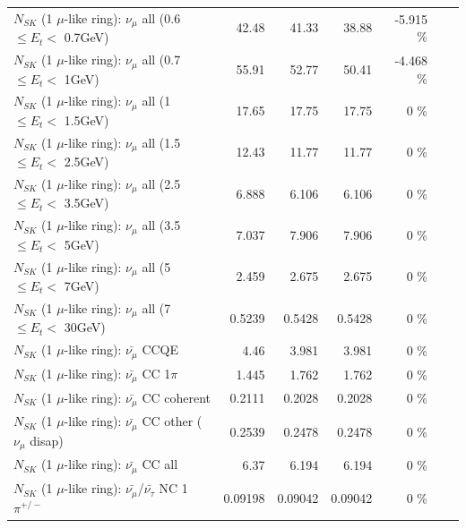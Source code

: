 \begin{table}
\begin{tabular}{| l | r | r | r  r | r  r |}
       $N_{SK}$ (1 $\mu$-like ring): $\nu_{\mu}$ all (0.6 $\leq E_{t} <$ 0.7GeV) &           42.48 &          41.33 &          38.88 &  -5.915 \%  & & \\
         $N_{SK}$ (1 $\mu$-like ring): $\nu_{\mu}$ all (0.7 $\leq E_{t} <$ 1GeV) &           55.91 &          52.77 &          50.41 &  -4.468 \%  & & \\
         $N_{SK}$ (1 $\mu$-like ring): $\nu_{\mu}$ all (1 $\leq E_{t} <$ 1.5GeV) &           17.65 &          17.75 &          17.75 &       0 \%  & & \\
       $N_{SK}$ (1 $\mu$-like ring): $\nu_{\mu}$ all (1.5 $\leq E_{t} <$ 2.5GeV) &           12.43 &          11.77 &          11.77 &       0 \%  & & \\
       $N_{SK}$ (1 $\mu$-like ring): $\nu_{\mu}$ all (2.5 $\leq E_{t} <$ 3.5GeV) &           6.888 &          6.106 &          6.106 &       0 \%  & & \\
         $N_{SK}$ (1 $\mu$-like ring): $\nu_{\mu}$ all (3.5 $\leq E_{t} <$ 5GeV) &           7.037 &          7.906 &          7.906 &       0 \%  & & \\
           $N_{SK}$ (1 $\mu$-like ring): $\nu_{\mu}$ all (5 $\leq E_{t} <$ 7GeV) &           2.459 &          2.675 &          2.675 &       0 \%  & & \\
          $N_{SK}$ (1 $\mu$-like ring): $\nu_{\mu}$ all (7 $\leq E_{t} <$ 30GeV) &          0.5239 &         0.5428 &         0.5428 &       0 \%  & & \\
\hline
\hline
\hline
                              $N_{SK}$ (1 $\mu$-like ring): $\bar{\nu_\mu}$ CCQE &            4.46 &          3.981 &          3.981 &       0 \%  & & \\
                         $N_{SK}$ (1 $\mu$-like ring): $\bar{\nu_\mu}$ CC 1$\pi$ &           1.445 &          1.762 &          1.762 &       0 \%  & & \\
                       $N_{SK}$ (1 $\mu$-like ring): $\bar{\nu_\mu}$ CC coherent &          0.2111 &         0.2028 &         0.2028 &       0 \%  & & \\
        $N_{SK}$ (1 $\mu$-like ring): $\bar{\nu_\mu}$ CC other ($\nu_\mu$ disap) &          0.2539 &         0.2478 &         0.2478 &       0 \%  & & \\
                          $N_{SK}$ (1 $\mu$-like ring): $\bar{\nu_{\mu}}$ CC all &            6.37 &          6.194 &          6.194 &       0 \%  & & \\
\hline
  $N_{SK}$ (1 $\mu$-like ring): $\bar{\nu_\mu}$/$\bar{\nu_\tau}$ NC 1$\pi^{+/-}$ &         0.09198 &        0.09042 &        0.09042 &       0 \%  & & \\

\end{tabular}
\end{table}
